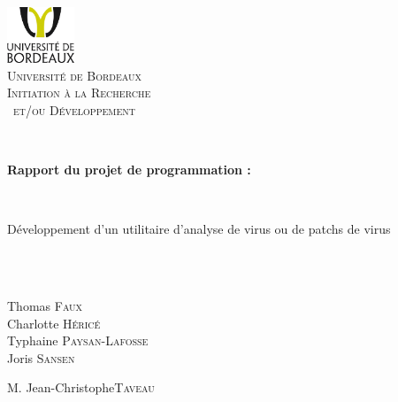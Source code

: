 %

\begin{titlepage}

\begin{center}


\includegraphics[width=0.15\textwidth]{logounibdx.png}\\[1cm]

\textsc{\LARGE Université de Bordeaux}\\[1.5cm]
\vspace*{0.5cm}
\textsc{\Large Initiation à la Recherche\\\ et/ou Développement}\\[0.5cm]

\vspace*{1cm}

\HRule \\[0.3cm]
{ \begin{Huge}
\bfseries Rapport du projet de programmation :
\end{Huge} \\ \begin{huge}
Développement d'un utilitaire d'analyse de virus ou de patchs de virus
\end{huge}}\\[0.3cm]

\HRule \\[1.5cm]
\begin{minipage}{0.4\textwidth}
\begin{center} \large
Thomas \textsc{Faux}\\
Charlotte \textsc{Héricé}\\
Typhaine \textsc{Paysan-Lafosse}\\
Joris \textsc{Sansen}\\
\end{center}
\end{minipage}
\begin{minipage}{0.4\textwidth}
\begin{flushright} \large
M. Jean-Christophe\textsc{Taveau}
\end{flushright}
\end{minipage}


\end{center}
\end{titlepage}
